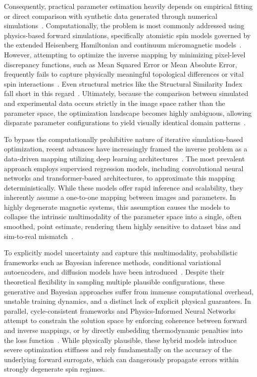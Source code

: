 \documentclass[final,5p,times,twocolumn]{elsarticle}
\begin{document}
Consequently, practical parameter estimation heavily depends on empirical fitting or direct comparison with synthetic data generated through numerical simulations~\cite{zeng2022direct}. Computationally, the problem is most commonly addressed using physics-based forward simulations, specifically atomistic spin models governed by the extended Heisenberg Hamiltonian and continuum micromagnetic models~\cite{d2023micromagnetic, lepadatu2021micromagnetic, silva2024three}. However, attempting to optimize the inverse mapping by minimizing pixel-level discrepancy functions, such as Mean Squared Error or Mean Absolute Error, frequently fails to capture physically meaningful topological differences or vital spin interactions~\cite{talapatra2022understanding}. Even structural metrics like the Structural Similarity Index fall short in this regard~\cite{karnatov2025analysis}. Ultimately, because the comparison between simulated and experimental data occurs strictly in the image space rather than the parameter space, the optimization landscape becomes highly ambiguous, allowing disparate parameter configurations to yield visually identical domain patterns~\cite{yin2023computational}.

To bypass the computationally prohibitive nature of iterative simulation-based optimization, recent advances have increasingly framed the inverse problem as a data-driven mapping utilizing deep learning architectures~\cite{lee2024deep}. The most prevalent approach employs supervised regression models, including convolutional neural networks and transformer-based architectures, to approximate this mapping deterministically. While these models offer rapid inference and scalability, they inherently assume a one-to-one mapping between images and parameters. In highly degenerate magnetic systems, this assumption causes the models to collapse the intrinsic multimodality of the parameter space into a single, often smoothed, point estimate, rendering them highly sensitive to dataset bias and sim-to-real mismatch~\cite{chen2024data}. 

To explicitly model uncertainty and capture this multimodality, probabilistic frameworks such as Bayesian inference methods, conditional variational autoencoders, and diffusion models have been introduced~\cite{zhao2023generative}. Despite their theoretical flexibility in sampling multiple plausible configurations, these generative and Bayesian approaches suffer from immense computational overhead, unstable training dynamics, and a distinct lack of explicit physical guarantees. In parallel, cycle-consistent frameworks and Physics-Informed Neural Networks attempt to constrain the solution space by enforcing coherence between forward and inverse mappings, or by directly embedding thermodynamic penalties into the loss function~\cite{huang2023cycle, baldan2023physics}. While physically plausible, these hybrid models introduce severe optimization stiffness and rely fundamentally on the accuracy of the underlying forward surrogate, which can dangerously propagate errors within strongly degenerate spin regimes.
\end{document}
